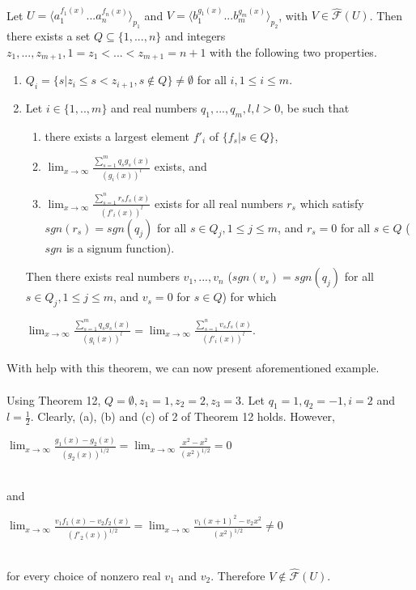 \paragraph{}
\cveta Let $U = \langle a_{1}^{f_{1}(x)}...a_{n}^{f_{n}(x)} \rangle_{p_{1}} $ and $V = \langle b_{1}^{g_{1}(x)}...b_{m}^{g_{m}(x)} \rangle_{p_{2}} $, with $V \in \hat{\mathcal{F}}(U) $. Then there exists a set $Q \subseteq \{ 1, ..., n \} $ and integers $z_{1}, ..., z_{m+1}, 1=z_{1} < ... < z_{m+1} = n+1 $ with the following two properties.
\begin{enumerate}
\item $Q_{i} = \{ s | z_{i} \leq s < z_{i+1}, s \notin Q \} \neq \emptyset $ for all $i, 1 \leq i \leq m$.
\item Let $i \in \{ 1, .., m\} $ and real numbers $q_{1}, ..., q_{m}, l, l >0$, be such that
\begin{enumerate}
\item there exists a largest element $f'_{i}$ of $\{ f_{s} | s \in Q \} $,
\item $\lim_{x\to \infty }\frac{\sum_{s=1}^{m}q_{s}g_{s}(x)}{(g_{i}(x))^{l}}$ exists, and
\item $\lim_{x\to \infty }\frac{\sum_{s=1}^{n}r_{s}f_{s}(x)}{(f'_{i}(x))^{l}}$ exists for all real numbers $r_{s}$ which satisfy $sgn(r_{s}) = sgn(q_{j})$ for all $s \in Q_{j}, 1 \leq j \leq m$, and $r_{s} = 0$ for all $s \in Q$ ($sgn$ is a signum function).
\end{enumerate}
Then there exists real numbers $v_{1},...,v_{n}$ ($sgn(v_{s}) = sgn(q_{j})$ for all $s \in Q_{j}, 1 \leq j \leq m$, and $v_{s} = 0$ for $s\in Q$) for which \\
\centerline{$\lim_{x\to \infty }\frac{\sum_{s=1}^{m}q_{s}g_{s}(x)}{(g_{i}(x))^{l}} = \lim_{x\to \infty }\frac{\sum_{s=1}^{n}v_{s}f_{s}(x)}{(f'_{i}(x))^{l}}$.}
\end{enumerate} 

\paragraph{}
With help with this theorem, we can now present aforementioned example.

\paragraph{}
\priklad Using Theorem 12, $Q = \emptyset, z_{1} = 1, z_{2} = 2, z_{3} = 3$. Let $q_{1} = 1, q_{2} = -1, i = 2$ and $l = \frac{1}{2}$. Clearly, (a), (b) and (c) of 2 of Theorem 12 holds. However, \\
\centerline{$\lim_{x\to \infty }\frac{g_{1}(x)-g_{2}(x)}{(g_{2}(x))^{1/2}} = \lim_{x\to \infty }\frac{x^{2}-x^{2}}{(x^{2})^{1/2}} = 0$} \\
and \\
\centerline{$\lim_{x\to \infty }\frac{v_{1}f_{1}(x)-v_{2}f_{2}(x)}{(f'_{2}(x))^{1/2}} = \lim_{x\to \infty }\frac{v_{1}(x+1)^{2}-v_{2}x^{2}}{(x^{2})^{1/2}} \neq 0$} \\
for every choice of nonzero real $v_{1}$ and $v_{2}$. Therefore $V \notin \hat{\mathcal{F}}(U)$.

